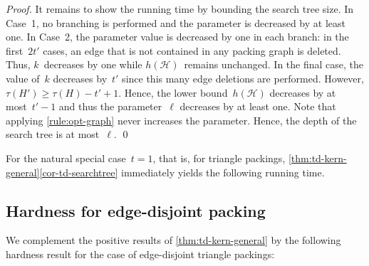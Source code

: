 \documentclass[envcountsame,numbook,smallextended]{svjour3}
\numberwithin{equation}{section}
\numberwithin{figure}{section}
\newcommand{\packing}{\ensuremath{\mathcal H}}
\newcommand{\TAGP}{\textsc{Triangle Deletion with  Cost-$t$ Packing}}
\newcommand{\TATP}{\textsc{Triangle Deletion with  Triangle Packing}}
\begin{document}
\begin{proof}
  It remains to show the running time by bounding the search tree size. In Case~1, no branching is performed and the parameter is decreased by at least one. In Case~2, the parameter value is decreased by one in each branch: in the first~$2t'$ cases, an edge that is not contained in any packing graph is deleted. Thus, $k$~decreases by one while $h(\packing)$~remains unchanged. In the final case, the value of~$k$ decreases by~$t'$ since this many edge deletions are performed. However, $\tau(H')\ge\tau(H)-t'+1$.  Hence, the lower bound~$h(\packing)$ decreases by at most~$t'-1$ and thus the parameter~$\ell$ decreases by at least one.  Note that applying \cref{rule:opt-graph} never increases the parameter. Hence, the depth of the search tree is at most~$\ell$.  \qed\end{proof} 

For the natural special case~$t=1$, that is, for triangle packings, \cref{thm:td-kern-general}\eqref{cor-td-searchtree} immediately yields the following running time.

















\subsection{Hardness for edge-disjoint packing}\label{sec:trdneg}
\noindent We complement the positive results of \cref{thm:td-kern-general} by the following hardness result for the case of edge-disjoint triangle packings:
\end{document}
